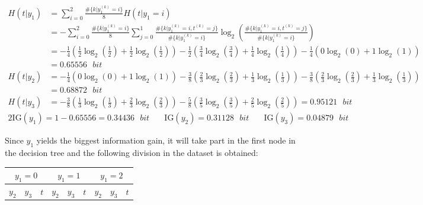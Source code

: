 \documentclass{exam}
\begin{document}
\begin{questions}
\begin{itemize}
            \begin{align*}
                H(t|y_1) &= \sum_{i = 0}^{2} \frac{\#\{k|y_1^{(k)} = i\}}{8}H(t|y_1 = i)\\
                &= - \sum_{i = 0}^{2} \frac{\#\{k|y_1^{(k)} = i\}}{8} \sum_{j = 0}^{1} \frac{\#\{k|y_1^{(k)} = i, t^{(k)} = j\}}{\#\{k|y_1^{(k)} = i\}} \log_2\left( \frac{\#\{k|y_1^{(k)} = i, t^{(k)} = j\}}{\#\{k|y_1^{(k)} = i\}}\right) \\
                &= - \frac{1}{4}\left( \frac{1}{2}\log_2\left(\frac{1}{2}\right) + \frac{1}{2}\log_2\left(\frac{1}{2}\right)\right) - \frac{1}{2} \left( \frac{3}{4}\log_2\left(\frac{3}{4}\right) + \frac{1}{4}\log_2\left(\frac{1}{4}\right)\right) - \frac{1}{4} \left( 0\log_2\left(0\right) + 1\log_2(1)\right) \\
                &= 0.65556  \text{ }bit\\
                H(t|y_2) &= - \frac{1}{4}\left(0\log_2(0) + 1\log_2(1)\right) - \frac{3}{8} \left( \frac{2}{3}\log_2\left(\frac{2}{3}\right) + \frac{1}{3}\log_2\left(\frac{1}{3}\right)\right) - \frac{3}{8} \left( \frac{2}{3}\log_2\left(\frac{2}{3}\right) + \frac{1}{3}\log_2\left(\frac{1}{3}\right)\right) \\
                &= 0.68872  \text{ }bit\\
                H(t|y_3) &= - \frac{3}{8}\left(\frac{1}{3}\log_2\left(\frac{1}{3}\right) + \frac{2}{3}\log_2\left(\frac{2}{3}\right)\right) - \frac{5}{8} \left( \frac{3}{5}\log_2\left(\frac{3}{5}\right) + \frac{2}{5}\log_2\left(\frac{2}{5}\right)\right) = 0.95121 \text{ }bit
            \end{align*}
            \begin{alignat*}{2}
                \text{IG}(y_1) = 1 - 0.65556  = 0.34436 \text{ }bit \quad & \text{IG}(y_2) = 0.31128 \text{ }bit \quad & \text{IG}(y_3) = 0.04879 \text{ }bit
            \end{alignat*}
        \end{itemize}
        Since $y_1$ yields the biggest information gain, it will take part in the first node in the decision tree and the following division in the dataset is obtained:
        \begin{table}[H]
            \centering
            \begin{tabular}{lll|lll|lll}
            \multicolumn{3}{c|}{$y_1  = 0$} & \multicolumn{3}{c|}{$y_1 = 1$} & \multicolumn{3}{c}{$y_1 = 2$} \\ \hline
            $y_2$     & $y_3$     & $t$    & $y_2$     & $y_3$     & $t$    & $y_2$     & $y_3$     & $t$    \\ \hline

\end{tabular}
\end{table}
\end{questions}
\end{document}
